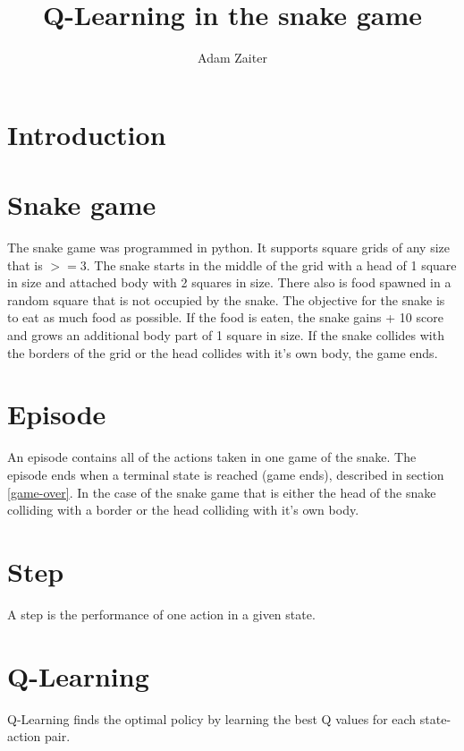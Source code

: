 \documentclass[lettersize,journal]{IEEEtran}
\begin{document}
\title{Q-Learning in the snake game}
\author{Adam Zaiter}

\maketitle

\begin{abstract}
\end{abstract}

\begin{IEEEkeywords}
\end{IEEEkeywords}


\section{Introduction}

\section{Snake game}
The snake game was programmed in python.
It supports square grids of any size that is $>= 3$.
The snake starts in the middle of the grid with a head of
1 square in size and attached
body with 2 squares in size. There also is food spawned in a random
square that is not occupied by the snake. The objective for the
snake is to eat as much food as possible. If the food is eaten,
the snake gains + 10 score and grows an additional body part of
1 square in size. If the snake collides with the borders of the grid
or the head collides with it's own body, the game ends.\label{game-over}

\section{Episode}
An episode contains all of the actions taken in one game
of the snake. The episode ends when a terminal state is
reached (game ends), described in section \ref{game-over}. In the case of the snake game that is either
the head of the snake colliding with a border or the head
colliding with it's own body.

\section{Step}
A step is the performance of one action in a given state.



\section{Q-Learning}
Q-Learning finds the optimal policy by learning
the best Q values for each state-action pair.
\end{document}
